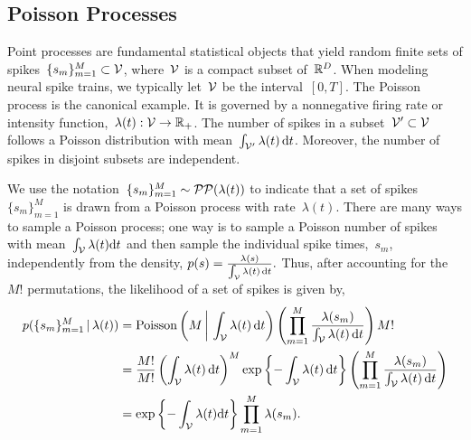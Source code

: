 \subsection{Poisson Processes}
\sloppy Point processes are fundamental statistical objects that yield
random finite sets of spikes~${\{s_m\}_{m=1}^M \subset \mathcal{V}}$,
where~$\mathcal{V}$ is a compact subset of~${\mathbb{R}^D}$.  When modeling
neural spike trains, we typically let~${\mathcal{V}}$ be the
interval~${[0,T]}$. The Poisson process is the canonical example. It
is governed by a nonnegative firing rate or intensity
function,~${\lambda(t): \mathcal{V} \rightarrow\mathbb{R}_+}$. The number of
spikes in a subset~${\mathcal{V}'\subset\mathcal{V}}$ follows a Poisson distribution
with mean~${\int_{\mathcal{V}'}\lambda(t) \, \mathrm{d}t}$. Moreover, the number
of spikes in disjoint subsets are independent.

We use the notation~${\{s_m\}_{m=1}^M\sim\mathcal{PP}(\lambda(t))}$ to indicate
that a set of spikes~$\{s_m\}_{m=1}^M$ is drawn from a Poisson process
with rate~$\lambda(t)$. There are many ways to sample a Poisson
process; one way is to sample a Poisson number of spikes with
mean~${\int_{\mathcal{V}} \lambda(t) \mathrm{d}t}$ and then sample the individual
spike times,~$s_m$, independently from the density,
${
  p(s) = \frac{\lambda(s)}{\int_{\mathcal{V}} \lambda(t) \, \mathrm{d}t}.
}$
Thus, after accounting for the~$M!$ permutations,
the likelihood of a set of spikes is given by,
\begin{align}
  \nonumber
  p(\{s_m\}_{m=1}^M \,|\, \lambda(t))
  &= \mathrm{Poisson} \left(M \, \bigg| \, \int_{\mathcal{V}} \lambda(t) \, \mathrm{d} t \right)
  \left( \prod_{m=1}^M \frac{\lambda(s_m)}{\int_{\mathcal{V}} \lambda(t) \, \mathrm{d}t} \right)  M! \\
  \nonumber
  &= \frac{M!}{M!} \left(\int_{\mathcal{V}} \lambda(t) \, \mathrm{d} t \right)^M
  \exp \left \{-\int_{\mathcal{V}} \lambda(t) \, \mathrm{d} t \right \} 
  \left( \prod_{m=1}^M \frac{\lambda(s_m)}{\int_{\mathcal{V}} \lambda(t) \, \mathrm{d}t} \right) \\
  \label{eq:poisson_lkhd}
  &=\exp\left\{-\int_{\mathcal{V}}\lambda(t)\mathrm{d}t \right\}
  \prod_{m=1}^M\lambda(s_m).
\end{align}

